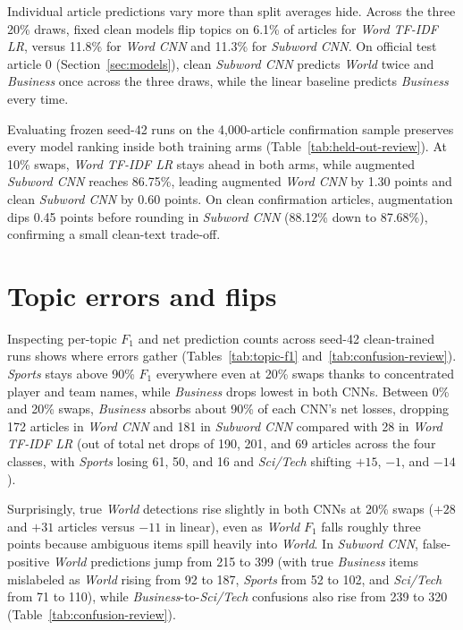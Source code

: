 Individual article predictions vary more than split averages hide. Across the three 20\% draws, fixed clean models flip topics on 6.1\% of articles for \textit{Word TF-IDF LR}, versus 11.8\% for \textit{Word CNN} and 11.3\% for \textit{Subword CNN}. On official test article 0 (Section~\ref{sec:models}), clean \textit{Subword CNN} predicts \emph{World} twice and \emph{Business} once across the three draws, while the linear baseline predicts \emph{Business} every time.

\newpage
Evaluating frozen seed-42 runs on the 4,000-article confirmation sample preserves every model ranking inside both training arms (Table~\ref{tab:held-out-review}). At 10\% swaps, \textit{Word TF-IDF LR} stays ahead in both arms, while augmented \textit{Subword CNN} reaches 86.75\%, leading augmented \textit{Word CNN} by 1.30 points and clean \textit{Subword CNN} by 0.60 points. On clean confirmation articles, augmentation dips 0.45 points before rounding in \textit{Subword CNN} (88.12\% down to 87.68\%), confirming a small clean-text trade-off.



\section{Topic errors and flips}\label{sec:error-analysis}
Inspecting per-topic $F_1$ and net prediction counts across seed-42 clean-trained runs shows where errors gather (Tables~\ref{tab:topic-f1} and~\ref{tab:confusion-review}). \emph{Sports} stays above 90\% $F_1$ everywhere even at 20\% swaps thanks to concentrated player and team names, while \emph{Business} drops lowest in both CNNs. Between 0\% and 20\% swaps, \emph{Business} absorbs about 90\% of each CNN's net losses, dropping 172 articles in \textit{Word CNN} and 181 in \textit{Subword CNN} compared with 28 in \textit{Word TF-IDF LR} (out of total net drops of 190, 201, and 69 articles across the four classes, with \emph{Sports} losing 61, 50, and 16 and \emph{Sci/Tech} shifting $+15$, $-1$, and $-14$).



Surprisingly, true \emph{World} detections rise slightly in both CNNs at 20\% swaps ($+28$ and $+31$ articles versus $-11$ in linear), even as \emph{World} $F_1$ falls roughly three points because ambiguous items spill heavily into \emph{World}. In \textit{Subword CNN}, false-positive \emph{World} predictions jump from 215 to 399 (with true \emph{Business} items mislabeled as \emph{World} rising from 92 to 187, \emph{Sports} from 52 to 102, and \emph{Sci/Tech} from 71 to 110), while \emph{Business}-to-\emph{Sci/Tech} confusions also rise from 239 to 320 (Table~\ref{tab:confusion-review}).

